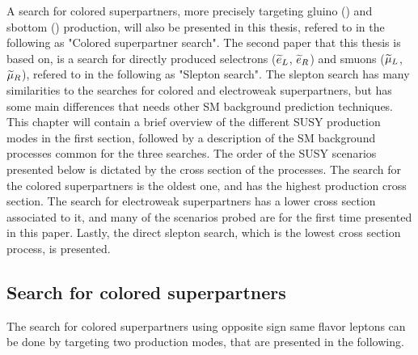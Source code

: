 A search for colored superpartners, more precisely targeting gluino (\gluino) and sbottom (\sbottom) production, will also be presented in this thesis, refered to in the following as "Colored superpartner search".
The second paper that this thesis is based on, is a search for directly produced selectrons ($\widetilde{e}_{L}$, $\widetilde{e}_{R}$) and smuons ($\widetilde{\mu}_{L}$, $\widetilde{\mu}_{R}$), refered to in the following as "Slepton search". 
The slepton search has many similarities to the searches for colored and electroweak superpartners, but has some main differences that needs other SM background prediction techniques. 
\newpara
\noindent\justify
This chapter will contain a brief overview of the different SUSY production modes in the first section, followed by a description of the SM background processes common for the three searches. 
The order of the SUSY scenarios presented below is dictated by the cross section of the processes. 
The search for the colored superpartners is the oldest one, and has the highest production cross section. 
The search for electroweak superpartners has a lower cross section associated to it, and many of the scenarios probed are for the first time presented in this paper. 
Lastly, the direct slepton search, which is the lowest cross section process, is presented. 
\subsection*{Search for colored superpartners}\label{sec:searchStrong}
\noindent\justify
The search for colored superpartners using opposite sign same flavor leptons can be done by targeting two production modes, that are presented in the following. 
